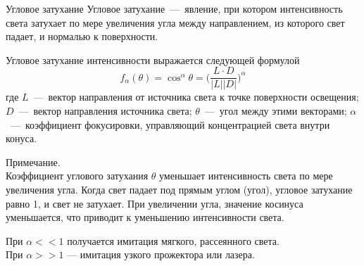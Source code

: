 \documentclass{beamer}
\begin{document}
	\begin{frame}{Угловое затухание}
		Угловое затухание~---~явление, при котором интенсивность света затухает по мере увеличения угла между направлением, из которого свет падает, и нормалью к поверхности. 


		Угловое затухание интенсивности выражается следующей формулой
		\[
			f_{\alpha}(\theta) = \cos^{\alpha} \theta
			=
			\bigg( \frac{L \cdot D}{ \lvert L \rvert \lvert D \rvert} \bigg)^\alpha
		\]
		где
		$L$~---~вектор направления от источника света к точке поверхности освещения;
		$D$~---~вектор направления источника света;
		$\theta$~---~угол между этими векторами;
		$\alpha$~---~коэффициент фокусировки, управляющий концентрацией света внутри конуса.


		\footnotesize
		Примечание.\\
		Коэффициент углового затухания $\theta$ уменьшает интенсивность света по мере увеличения угла. 
		Когда свет падает под прямым углом (угол), угловое затухание равно 1, и свет не затухает. 
		При увеличении угла, значение косинуса уменьшается, что приводит к уменьшению интенсивности света.

		При $\alpha << 1$ получается имитация мягкого, рассеянного света.\\
		При $\alpha >> 1$ ---  имитация узкого прожектора или лазера.

		

\end{frame}
\end{document}

